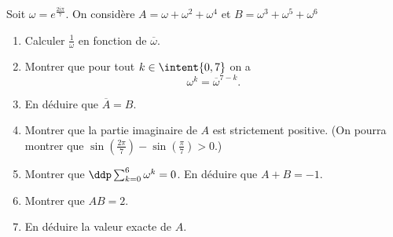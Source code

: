 \documentclass[a4paper, 11pt,reqno]{article}
\begin{document}
\begin{exercice}
Soit $\omega =e^{\frac{2i\pi}{7}}$. On considère $A=\omega+\omega^2 +\omega^4$ et $B =\omega^3+\omega^5 +\omega^6$

\begin{enumerate}
\item Calculer $\frac{1}{\omega}$ en fonction de $\overline{\omega}$.
\item Montrer que pour tout $k\in \intent{0,7}$ on a 
$$\omega^k =\overline{\omega}^{7-k}.$$
\item En déduire que $\overline{A}=B$.
\item Montrer que la partie imaginaire de $A$ est strictement positive. (On pourra montrer que $\sin\left( \frac{2\pi}{7}\right)-\sin\left( \frac{\pi}{7}\right)>0$.)
\item  Montrer que $\ddp \sum_{k=0}^6 \omega^k =0$. En déduire que $A+B=-1$.
\item Montrer que $AB=2$. 

\item En déduire la valeur exacte de $A$.


\end{enumerate}
\end{exercice}

%
% 
\end{document}
